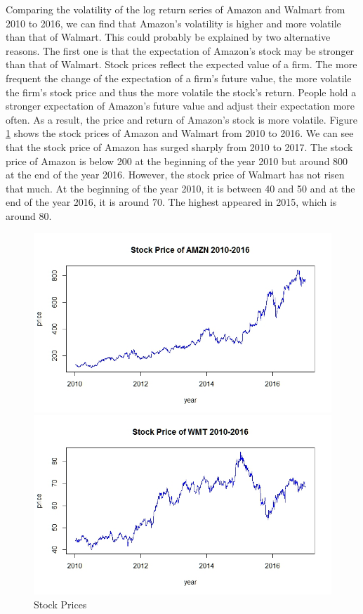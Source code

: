 \documentclass[paper=a4, fontsize=11pt]{article}
\begin{document}
Comparing the volatility of the log return series of Amazon and Walmart from 2010 to 2016, we can find that Amazon's volatility is higher and more volatile than that of Walmart. This could probably be explained by two alternative reasons. The first one is that the expectation of Amazon's stock may be stronger than that of Walmart. Stock prices reflect the expected value of a firm. The more frequent the change of the expectation of a firm's future value, the more volatile the firm's stock price and thus the more volatile the stock's return. People hold a stronger expectation of Amazon’s future value and adjust their expectation more often. As a result, the price and return of Amazon's stock is more volatile. Figure \ref{price} shows the stock prices of Amazon and Walmart from 2010 to 2016. We can see that the stock price of Amazon has surged sharply from 2010 to 2017. The stock price of Amazon is below 200 at the beginning of the year 2010 but around 800 at the end of the year 2016. However, the stock price of Walmart has not risen that much. At the beginning of the year 2010, it is between 40 and 50 and at the end of the year 2016, it is around 70. The highest appeared in 2015, which is around 80.

\begin{figure}[!htbp]
\begin{minipage}[!htbp]{0.5\linewidth}
\centering
\includegraphics[scale = 0.45]{img/price_AMZN}
\end{minipage}
\begin{minipage}[!htbp]{0.5\linewidth}
\centering
\includegraphics[scale = 0.45]{img/price_WMT}
\end{minipage}
\caption{Stock Prices}
\label{price}
\end{figure}
\end{document}
